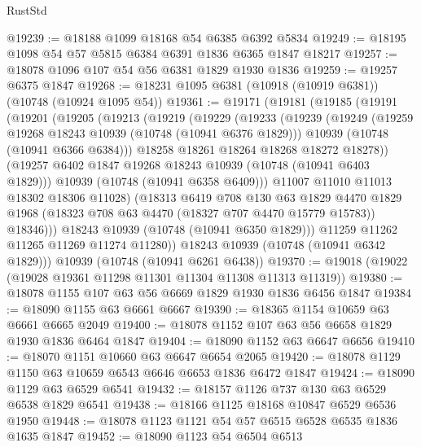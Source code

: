 \begin{lexlean}{RustStd}
\begin{coremodule}
{\begin{coremodule}
{{{{{@19239 := @18188 @1099 @18168 @54 @6385 @6392 @5834
@19249 := @18195 @1098 @54 @57 @5815 @6384 @6391 @1836 @6365 @1847 @18217
@19257 := @18078 @1096 @107 @54 @56 @6381 @1829 @1930 @1836
@19259 := @19257 @6375 @1847
@19268 := @18231 @1095 @6381 (@10918 (@10919 @6381)) (@10748 (@10924 @1095 @54))
@19361 := @19171
    (@19181
      (@19185
        (@19191
          (@19201
            (@19205
              (@19213
                (@19219
                  (@19229
                    (@19233
                      (@19239
                        (@19249
                          (@19259 @19268 @18243 @10939 (@10748 (@10941 @6376 @1829)))
                          @10939
                          (@10748 (@10941 @6366 @6384)))
                        @18258
                        @18261
                        @18264
                        @18268
                        @18272
                        @18278))
                    (@19257 @6402 @1847 @19268 @18243 @10939 (@10748 (@10941 @6403 @1829)))
                    @10939
                    (@10748 (@10941 @6358 @6409)))
                  @11007
                  @11010
                  @11013
                  @18302
                  @18306
                  @11028)
                (@18313
                  @6419
                  @708
                  @130
                  @63
                  @1829
                  @4470
                  @1829
                  @1968
                  (@18323 @708 @63 @4470 (@18327 @707 @4470 @15779 @15783))
                  @18346)))
            @18243
            @10939
            (@10748 (@10941 @6350 @1829)))
          @11259
          @11262
          @11265
          @11269
          @11274
          @11280))
      @18243
      @10939
      (@10748 (@10941 @6342 @1829)))
    @10939
    (@10748 (@10941 @6261 @6438))
@19370 := @19018 (@19022 (@19028 @19361 @11298 @11301 @11304 @11308 @11313 @11319))
@19380 := @18078 @1155 @107 @63 @56 @6669 @1829 @1930 @1836 @6456 @1847
@19384 := @18090 @1155 @63 @6661 @6667
@19390 := @18365 @1154 @10659 @63 @6661 @6665 @2049
@19400 := @18078 @1152 @107 @63 @56 @6658 @1829 @1930 @1836 @6464 @1847
@19404 := @18090 @1152 @63 @6647 @6656
@19410 := @18070 @1151 @10660 @63 @6647 @6654 @2065
@19420 := @18078 @1129 @1150 @63 @10659 @6543 @6646 @6653 @1836 @6472 @1847
@19424 := @18090 @1129 @63 @6529 @6541
@19432 := @18157 @1126 @737 @130 @63 @6529 @6538 @1829 @6541
@19438 := @18166 @1125 @18168 @10847 @6529 @6536 @1950
@19448 := @18078 @1123 @1121 @54 @57 @6515 @6528 @6535 @1836 @1635 @1847
@19452 := @18090 @1123 @54 @6504 @6513
}}}}}
\end{coremodule}}
\end{coremodule}
\end{lexlean}
